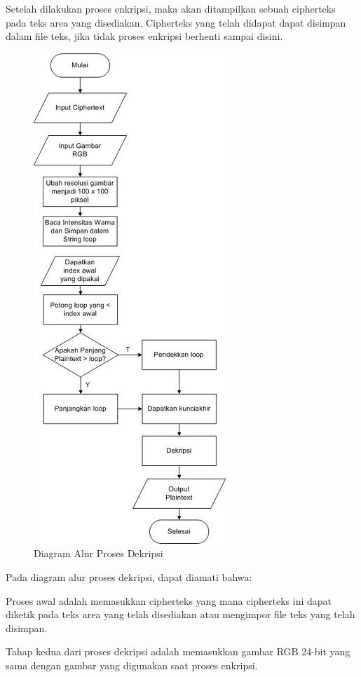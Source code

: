 \documentclass{jtetiproposalskripsi}
\begin{document}
Setelah dilakukan proses enkripsi, maka akan ditampilkan sebuah cipherteks pada teks area yang disediakan. Cipherteks yang telah didapat dapat disimpan dalam file teks, jika tidak proses enkripsi berhenti sampai disini.

\begin{figure}[ht!]
  \centering
    \includegraphics{gambar/dekripsi}
    \caption{Diagram Alur Proses Dekripsi}
    \label{Dekripsi}
\end{figure}

Pada diagram alur proses dekripsi, dapat diamati bahwa:

Proses awal adalah memasukkan cipherteks yang mana cipherteks ini dapat diketik pada teks area yang telah disediakan atau mengimpor file teks yang telah disimpan.

Tahap kedua dari proses dekripsi adalah memasukkan gambar RGB 24-bit yang sama dengan gambar yang digunakan saat proses enkripsi. 
\end{document}
